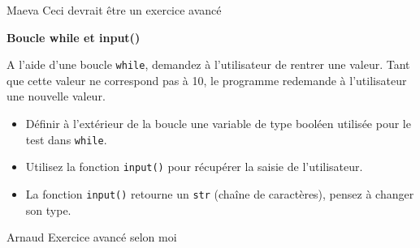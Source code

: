 \begin{note}{Maeva}
    Ceci devrait être un exercice avancé
\end{note}
 \begin{Exercice}[10 minutes] \textbf{Boucle while et input()}
      	
      	A l'aide d'une boucle \lstinline{while}, demandez à l'utilisateur de rentrer une valeur. Tant que cette valeur ne correspond pas à 10, le programme redemande à l'utilisateur une nouvelle valeur.
    
        \begin{conseil}
           \begin{itemize}
           	\item Définir à l'extérieur de la boucle une variable de type booléen utilisée pour le test dans \lstinline{while}.
           	\item Utilisez la fonction \lstinline{input()} pour récupérer la saisie de l'utilisateur.
           	\item La fonction \lstinline{input()} retourne un \lstinline{str} (chaîne de caractères), pensez à changer son type.
           \end{itemize}
		     
        \end{conseil}
        
        \begin{solution}
            
        \end{solution}
    \end{Exercice}
    
  \begin{note}{Arnaud}
    Exercice avancé selon moi
  \end{note}
    
